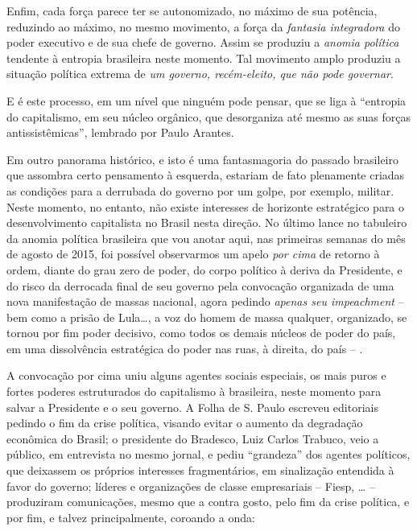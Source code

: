 Enfim, cada força parece ter se autonomizado, no máximo de sua potência,
reduzindo ao máximo, no mesmo movimento, a força da \emph{fantasia
integradora} do poder executivo e de sua chefe de governo. Assim se
produziu a \emph{anomia política} tendente à entropia brasileira neste
momento. Tal movimento amplo produziu a situação política extrema de
\emph{um governo, recém-eleito, que não pode governar}.

E é este processo, em um nível que ninguém pode pensar, que se liga à
``entropia do capitalismo, em seu núcleo orgânico, que desorganiza até
mesmo as suas forças antissistêmicas'', lembrado por Paulo Arantes.

Em outro panorama histórico, e isto é uma fantasmagoria do passado
brasileiro que assombra certo pensamento à esquerda, estariam de fato
plenamente criadas as condições para a derrubada do governo por um
golpe, por exemplo, militar. Neste momento, no entanto, não existe
interesses de horizonte estratégico para o desenvolvimento capitalista
no Brasil nesta direção. No último lance no tabuleiro da anomia política
brasileira que vou anotar aqui, nas primeiras semanas do mês de agosto
de 2015, foi possível observarmos um apelo \emph{por cima} de retorno à
ordem, diante do grau zero de poder, do corpo político à deriva da
Presidente, e do risco da derrocada final de seu governo pela convocação
organizada de uma nova manifestação de massas nacional, agora pedindo
\emph{apenas seu impeachment} -- bem como a prisão de Lula…, a voz do
homem de massa qualquer, organizado, se tornou por fim poder decisivo,
como todos os demais núcleos de poder do país, em uma dissolvência
estratégica do poder nas ruas, à direita, do país -- .

A convocação por cima uniu alguns agentes sociais especiais, os mais
puros e fortes poderes estruturados do capitalismo à brasileira, neste
momento para salvar a Presidente e o seu governo. A Folha de S. Paulo
escreveu editoriais pedindo o fim da crise política, visando evitar o
aumento da degradação econômica do Brasil; o presidente do Bradesco,
Luiz Carlos Trabuco, veio a público, em entrevista no mesmo jornal, e
pediu ``grandeza'' dos agentes políticos, que deixassem os próprios
interesses fragmentários, em sinalização entendida à favor do governo;
líderes e organizações de classe empresariais -- Fiesp, … --
produziram comunicações, mesmo que a contra gosto, pelo fim da crise
política, e por fim, e talvez principalmente, coroando a onda:

